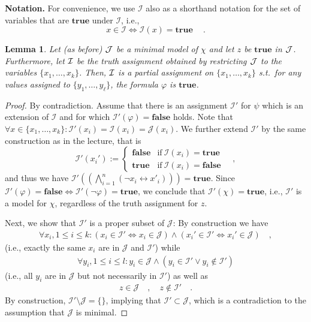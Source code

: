 \documentclass [11pt]{article}
\newtheorem{lemma}[theorem]{Lemma}
\renewcommand{\phi}{\varphi}
\newcommand{\True}{\mathbf{true}}
\newcommand{\False}{\mathbf{false}}
\newcommand{\mJ}{\ensuremath{\mathcal{J}}}
\newcommand{\mI}{\ensuremath{\mathcal{I}}}
\newcommand{\mIp}{\ensuremath{\mathcal{I'}}}
\begin{document}
\noindent
\textbf{Notation.} For convenience, we use $\mI$ also as a shorthand notation for the set of variables that are $\True$ under $\mI$, i.e., 
$$
x \in \mI \iff \mI(x) = \True\ \quad .
$$

\begin{lemma}
Let (as before) ${\cal J}$ be a minimal model of $\chi$ and let $z$ be $\True$ in ${\cal J}$.
Furthermore, let ${\cal I}$ be the truth assignment obtained by restricting ${\cal J}$ to the variables 
$\{x_1, \dots, x_k \}$. 
Then, ${\cal I}$ is a partial assignment on $\{x_1, \dots, x_k\}$ s.t.\ for any values assigned to $\{y_1, \dots, y_\ell\}$, the formula $\phi$ is $\True$. 
\end{lemma}
\begin{proof}
By contradiction. Assume that there is an assignment $\mIp$ for $\psi$ which is an extension of $\mI$ and for which $\mIp(\phi) = \False$ holds. 
Note that $\forall x \in \{x_1, \dots , x_k \}: \mIp(x_i) = \mI(x_i) = \mJ(x_i)$. We further extend $\mIp$ by the same construction as in the lecture, that is 
$$
\mIp(x_i') := 
\begin{cases}
 \False &  \text{if}\ \mI(x_i) = \True \\
 \True  &  \text{if}\ \mI(x_i) = \False
\end{cases} \quad ,
$$
and thus we have $\mIp\left(\left(\bigwedge_{i=1}^n (\neg x_i \leftrightarrow x'_i) \right)\right) = \True$.
Since $\mIp(\phi) = \False \iff \mIp(\neg \phi) = \True$, we conclude that $\mIp(\chi) = \True$, i.e., $\mIp$ is a model for $\chi$, regardless of the truth assignment for $z$. 

Next, we show that $\mIp$ is a proper subset of $\mJ$:
By construction we have 
\begin{align*}
\forall x_i, 1\leq i \leq k: (x_i \in \mIp \iff x_i \in \mJ) \land (x_i' \in \mIp \iff x_i' \in \mJ) \quad ,
\end{align*}
(i.e., exactly the same $x_i$ are in $\mJ$ and $\mIp$) while 
\begin{align*}
\forall y_i, 1\leq i \leq l: y_i \in \mJ \land (y_i \in \mIp \lor y_i \not \in \mIp)
\end{align*}
(i.e., all $y_i$ are in $\mJ$ but not necessarily in $\mIp$) as well as
\begin{align*}
 z \in \mJ \quad , \quad z \not \in \mIp \quad .
\end{align*}
By construction, $\mIp \setminus \mJ = \{\}$, implying that $\mIp \subset \mJ$, which is a contradiction to the assumption that $\mJ$ is minimal.

\end{proof}
\end{document}
